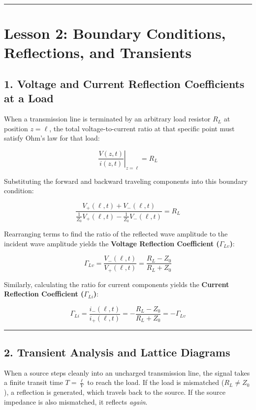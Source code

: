 \documentclass[
]{article}
\begin{document}
\begin{center}\rule{0.5\linewidth}{0.5pt}\end{center}

\section{Lesson 2: Boundary Conditions, Reflections, and
Transients}\label{lesson-2-boundary-conditions-reflections-and-transients}

\subsection{1. Voltage and Current Reflection Coefficients at a
Load}\label{voltage-and-current-reflection-coefficients-at-a-load}

When a transmission line is terminated by an arbitrary load resistor
\(R_L\) at position \(z = \ell\), the total voltage-to-current ratio at
that specific point must satisfy Ohm's law for that load:

\[\left. \frac{V(z,t)}{i(z,t)} \right|_{z=\ell} = R_L\]

Substituting the forward and backward traveling components into this
boundary condition:

\[\frac{V_+(\ell,t) + V_-(\ell,t)}{\frac{1}{Z_0}V_+(\ell,t) - \frac{1}{Z_0}V_-(\ell,t)} = R_L\]

Rearranging terms to find the ratio of the reflected wave amplitude to
the incident wave amplitude yields the \textbf{Voltage Reflection
Coefficient (\(\Gamma_{Lv}\))}:

\[\Gamma_{Lv} = \frac{V_-(\ell,t)}{V_+(\ell,t)} = \frac{R_L - Z_0}{R_L + Z_0}\]

Similarly, calculating the ratio for current components yields the
\textbf{Current Reflection Coefficient (\(\Gamma_{Li}\))}:

\[\Gamma_{Li} = \frac{i_-(\ell,t)}{i_+(\ell,t)} = -\frac{R_L - Z_0}{R_L + Z_0} = -\Gamma_{Lv}\]

\begin{center}\rule{0.5\linewidth}{0.5pt}\end{center}

\subsection{2. Transient Analysis and Lattice
Diagrams}\label{transient-analysis-and-lattice-diagrams}

When a source steps cleanly into an uncharged transmission line, the
signal takes a finite transit time \(T = \frac{\ell}{V}\) to reach the
load. If the load is mismatched (\(R_L \neq Z_0\)), a reflection is
generated, which travels back to the source. If the source impedance is
also mismatched, it reflects \emph{again}.
\end{document}
